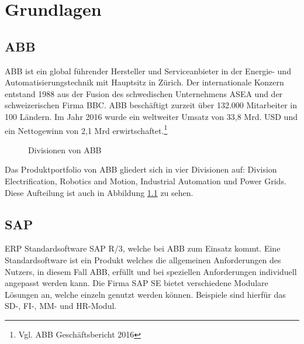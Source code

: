 
\chapter{Grundlagen}


\section{ABB}

ABB ist ein global f\"{u}hrender Hersteller und Serviceanbieter in der Energie- und Automatisierungstechnik mit Hauptsitz in Z\"{u}rich.
Der internationale Konzern entstand 1988 aus der Fusion des schwedischen Unternehmens \ac{ASEA} und der schweizerischen Firma \ac{BBC}. ABB besch\"{a}ftigt zurzeit \"{u}ber 132.000 Mitarbeiter in 100 L\"{a}ndern. Im Jahr 2016 wurde ein weltweiter Umsatz von 33,8 Mrd. USD und ein Nettogewinn von 2,1 Mrd erwirtschaftet.\footnote{Vgl. ABB Gesch\"{a}ftsbericht 2016} 
\linebreak



\begin{figure}[!hpt]
	\centering
	
	\caption{Divisionen von ABB}
	\label{fig1}
	
\end{figure}

Das Produktportfolio von ABB gliedert sich in vier Divisionen auf: Division Electrification, Robotics and Motion, Industrial Automation und Power Grids. Diese Aufteilung ist auch in Abbildung \ref{fig1} zu sehen.


\section{SAP}



\ac{ERP} Standardsoftware SAP R/3, welche bei ABB zum Einsatz kommt. Eine Standardsoftware ist ein Produkt welches die allgemeinen Anforderungen des Nutzers, in diesem Fall ABB, erfüllt und bei speziellen Anforderungen individuell angepasst werden kann. Die Firma SAP SE bietet verschiedene Modulare Lösungen an, welche einzeln genutzt werden können. Beispiele sind hierfür das \ac{SD}-, \ac{FI}-, \ac{MM}- und \ac{HR}-Modul. \\ 

